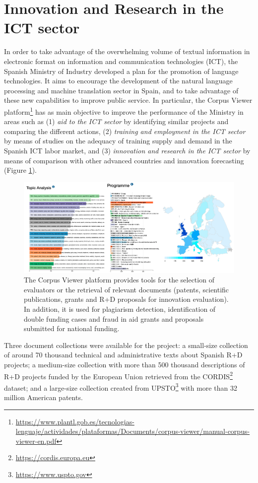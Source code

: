 \section{Innovation and Research in the ICT sector}
\label{sec:corpus-viewer}

In order to take advantage of the overwhelming volume of textual information in electronic format on information and communication technologies (ICT), the Spanish Ministry of Industry developed a plan for the promotion of language technologies. It aims to encourage the development of the natural language processing and machine translation sector in Spain, and to take advantage of these new capabilities to improve public service. In particular, the Corpus Viewer platform\footnote{\url{https://www.plantl.gob.es/tecnologias-lenguaje/actividades/plataformas/Documents/corpus-viewer/manual-corpus-viewer-en.pdf}} has as main objective to improve the performance of the Ministry in areas such as (1) \textit{aid to the ICT sector} by identifying similar projects and comparing the different actions, (2) \textit{training and employment in the ICT sector} by means of studies on the adequacy of training supply and demand in the Spanish ICT labor market, and (3) \textit{innovation and research in the ICT sector} by means of comparison with other advanced countries and innovation forecasting (Figure \ref{fig:corpus-viewer}).


\begin{figure}[ht]
    \centering
    \includegraphics[width=0.8\linewidth]{corpus-viewer.png}
    \caption{The Corpus Viewer platform provides tools for the selection of evaluators or the retrieval of relevant documents (patents, scientific publications, grants and R+D proposals for innovation evaluation). In addition, it is used for plagiarism detection, identification of double funding cases and fraud in aid grants and proposals submitted for national funding.}
    \label{fig:corpus-viewer}
\end{figure}

Three document collections were available for the project: a small-size collection of around 70 thousand technical and administrative texts about Spanish R+D projects; a medium-size collection with more than 500 thousand descriptions of R+D projects funded by the European Union retrieved from the CORDIS\footnote{\url{https://cordis.europa.eu}} dataset; and a large-size collection created from UPSTO\footnote{\url{https://www.uspto.gov}} with more than 32 million American patents.

